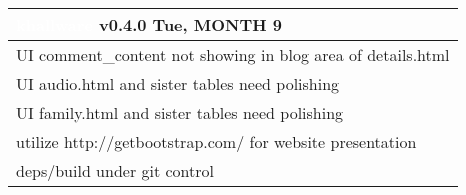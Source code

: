 \documentclass[notitlepage]{article}
\newcommand{\releasedate}{Tue, MONTH 9}
\begin{document}
\begin{center}
\begin{tabular}{ | l | }
\hline
\LARGE\cellcolor{myblue}\textcolor{white}{khallware} v0.4.0 \releasedate{} \\
\hline
UI comment\_content not showing in blog area of details.html \\
\hline
UI audio.html and sister tables need polishing \\
\hline
UI family.html and sister tables need polishing \\
\hline
utilize http://getbootstrap.com/ for website presentation \\
\hline
deps/build under git control \\
\hline

\end{tabular}
\end{center}
\end{document}
